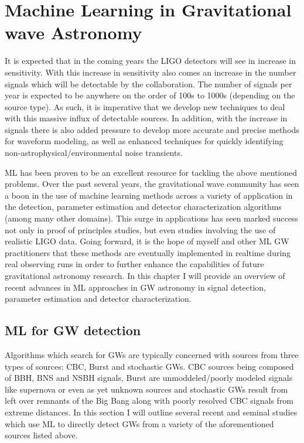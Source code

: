 \chapter[ML in Gravitational wave Astronomy]{Machine Learning in Gravitational wave Astronomy}


%
%
It is expected that in the coming years the \ac{LIGO} detectors will see in increase in sensitivity. With this increase in sensitivity also comes an increase in the number signals which will be detectable by the collaboration. The number of signals per year is expected to be anywhere on the order of 100s to 1000s (depending on the source type). As such, it is imperative that we develop new techniques to deal with this massive influx of detectable sources. In addition, with the increase in signals there is also added pressure to develop more accurate and precise methods for waveform modeling, as well as enhanced techniques for quickly identifying non-astrophysical/environmental noise transients.

\ac{ML} has been proven to be an excellent resource for tackling the above mentioned problems. Over the past several years, the gravitational wave community has seen a boon in the use of machine learning methods across a variety of application in the detection, parameter estimation and detector characterization algorithms (among many other domains). This surge in applications has seen marked success not only in proof of principles studies, but even studies involving the use of realistic \ac{LIGO} data. Going forward, it is the hope of myself and other \ac{ML} \ac{GW} practitioners that these methods are eventually implemented in realtime during real observing runs in order to further enhance the capabilities of future gravitational astronomy research. In this chapter I will provide an overview of recent advances in \ac{ML} approaches in \ac{GW} astronomy in signal detection, parameter estimation and detector characterization.

\section{ML for GW detection}

Algorithms which search for \ac{GW}s are typically concerned with sources from three types of sources: \ac{CBC}, Burst and stochastic \ac{GW}s. \ac{CBC} sources being composed of \ac{BBH}, \ac{BNS} and \ac{NSBH} signals, Burst are unmoddeled/poorly modeled signals like supernova or even as yet unknown sources and stochastic \ac{GW}s result from left over remnants of the Big Bang along with poorly resolved \ac{CBC} signals from extreme distances. In this section I will outline several recent and seminal studies which use \ac{ML} to directly detect \ac{GW}s from a variety of the aforementioned sources listed above.


